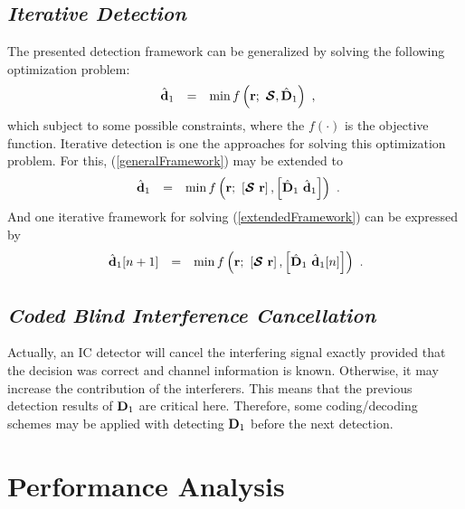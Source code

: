 \documentclass[a4paper,10pt,fleqn, twocolumn]{IEEETran}
\newcommand{\br}{{\mathbf r}}
\newcommand{\bd}{{\bf d}}
\newcommand{\bD}{{\bf D}}
\newcommand{\bcS}{{\mbox {\boldmath ${\cal S}$}}}
\begin{document}
\subsection{\em Iterative Detection}
The presented detection framework can be generalized by solving
the following optimization problem:
\begin{equation}
\begin{array}{rcl}
\hat{\bd}_{1}&=&\min{f\left(\br;\ \bcS,\hat{\bD}_1\right)}
\end{array},\label{generalFramework}
\end{equation}
\noindent which subject to some possible constraints, where the
$f\left(\cdot\right)$ is the objective function. Iterative
detection is one the approaches for solving this optimization
problem. For this, (\ref{generalFramework}) may be extended to
\begin{equation}
\begin{array}{rcl}
\hat{\bd}_{1}&=&\min{f\left(\br;\ \left[\bcS\
\br\right],\left[\hat{\bD}_1\ \hat{\bd}_1\right]\right)}
\end{array}.\label{extendedFramework}
\end{equation}
And one iterative framework for solving (\ref{extendedFramework})
can be expressed by
\begin{equation}\hspace{-0.05in}
\begin{array}{rcl}
\hat{\bd}_{1}[n+1]&=&\min{f\left(\br;\ \left[\bcS\
\br\right],\left[\hat{\bD}_1\ \hat{\bd}_1[n]\right]\right)}
\end{array}.
\end{equation}
\subsection{\em Coded Blind Interference Cancellation}
Actually, an IC detector will cancel the interfering signal
exactly provided that the decision was correct and channel
information is known. Otherwise, it may increase the contribution
of the interferers. This means that the previous detection results
of $\bD_{1}$ are critical here. Therefore, some coding/decoding
schemes may be applied with detecting $\bD_{1}$ before the next
detection.
\section{Performance Analysis}
\end{document}
